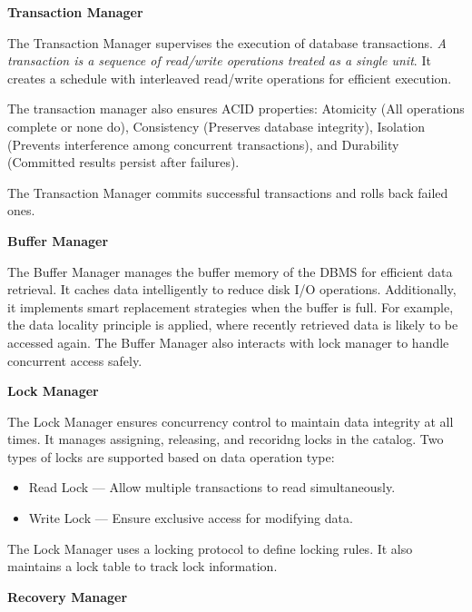 \documentclass[11pt]{article}
\begin{document}
\vspace{11pt}
\textbf{Transaction Manager}
\vspace{11pt}

The Transaction Manager supervises the execution of database transactions. \textit{A transaction is a sequence of read/write operations treated as a single unit}. It creates a schedule with interleaved read/write operations for efficient execution.

The transaction manager also ensures ACID properties: Atomicity (All operations complete or none do), Consistency (Preserves database integrity), Isolation (Prevents interference among concurrent transactions), and Durability (Committed results persist after failures). 

The Transaction Manager commits successful transactions and rolls back failed ones.

\vspace{11pt}
\textbf{Buffer Manager}
\vspace{11pt}

The Buffer Manager manages the buffer memory of the DBMS for efficient data retrieval. It caches data intelligently to reduce disk I/O operations. Additionally, it implements smart replacement strategies when the buffer is full. For example, the data locality principle is applied, where recently retrieved data is likely to be accessed again. The Buffer Manager also interacts with lock manager to handle concurrent access safely.

\vspace{11pt}
\textbf{Lock Manager}
\vspace{11pt}

The Lock Manager ensures concurrency control to maintain data integrity at all times. It manages assigning, releasing, and recoridng locks in the catalog. Two types of locks are supported based on data operation type:
\begin{itemize}
    \item Read Lock --- Allow multiple transactions to read simultaneously.
    \item Write Lock --- Ensure exclusive access for modifying data.
\end{itemize}

The Lock Manager uses a locking protocol to define locking rules. It also maintains a lock table to track lock information.

\vspace{11pt}
\textbf{Recovery Manager}
\vspace{11pt}
\end{document}
